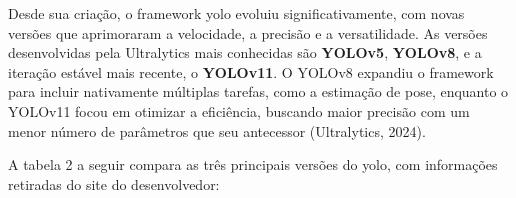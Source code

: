

Desde sua criação, o framework \ac{yolo} evoluiu significativamente, com novas versões que aprimoraram a velocidade, a precisão e a versatilidade. 
As versões desenvolvidas pela Ultralytics mais conhecidas são \textbf{YOLOv5}, \textbf{YOLOv8}, e a iteração estável mais recente, o \textbf{YOLOv11}. 
O YOLOv8 expandiu o framework para incluir nativamente múltiplas tarefas, como a estimação de pose, enquanto o YOLOv11 focou em otimizar a eficiência, buscando maior precisão com um menor número de parâmetros que seu antecessor (Ultralytics, 2024).

A tabela 2 a seguir compara as três principais versões do \ac{yolo}, com informações retiradas do site do desenvolvedor:

